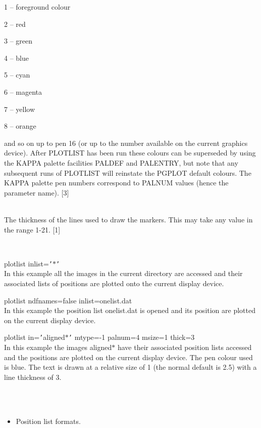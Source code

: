\documentclass[twoside,11pt]{article}
\newcommand{\xref}[3]{#1}
\renewcommand{\_}{\texttt{\symbol{95}}}
\newcommand{\qs}[1]{{\tt '}#1{\tt '}}
\newcommand{\routine}[1]{{\sc #1}}
\newcommand{\sstexamples}[1]{
   \item[Examples:] \mbox{} \\
   \vspace{-3.5ex}
   \begin{description}
      #1
   \end{description}
}
\newcommand{\sstsubsection}[1]{ \item[{#1}] \mbox{} \\}
\newcommand{\sstexamplesubsection}[2]{\sloppy \item{\ssttt #1} \mbox{} \\ #2 }
\newcommand{\sstnotes}[1]{\item[Notes:] \mbox{} \\[1.3ex] #1}
\newcommand{\sstitemlist}[1]{
  \mbox{} \\
  \vspace{-3.5ex}
  \begin{itemize}
     #1
  \end{itemize}
}
\newcommand{\sstitem}{\item}
\newcommand{\sstexamples}[1]{
      \item[Examples:] \\
      \begin{description}
         #1
      \end{description}
      \\
   }
\newcommand{\sstsubsection}[1]{\item[{#1}]}
\newcommand{\sstexamplesubsection}[2]{\item[{\ssttt #1}] #2}
\newcommand{\sstnotes}[1]{\item[Notes:] #1 }
\newcommand{\sstitemlist}[1]{
      \begin{itemize}
         #1
      \end{itemize}
      \\
   }
\newcommand{\sstitem}{\item}
\begin{document}
{{{{            \sstitem
               1 -- foreground colour

            \sstitem
               2 -- red

            \sstitem
               3 -- green

            \sstitem
               4 -- blue

            \sstitem
               5 -- cyan

            \sstitem
               6 -- magenta

            \sstitem
               7 -- yellow

            \sstitem
               8 -- orange

         }
         and so on up to pen 16 (or up to the number available on the
         current graphics device). After \routine{PLOTLIST} has been run these
         colours can be superseded by using the KAPPA palette
         facilities \xref{PALDEF}{sun95}{PALDEF} and
         \xref{PALENTRY}{sun95}{PALENTRY}, but note that any subsequent
         runs of \routine{PLOTLIST} will reinstate the \xref{PGPLOT}{sun15}{}
         default colours.
         The KAPPA palette pen numbers correspond to PALNUM values
         (hence the parameter name).
         [3]
      }
      \sstsubsection{
         THICK = \_INTEGER (Read)
      } {
         The thickness of the lines used to draw the markers. This may
         take any value in the range 1-21.
         [1]
      }
   }
   \sstexamples{
      \sstexamplesubsection{
         plotlist inlist=\qs{$*$}
      } {
         In this example all the images in the current directory are
         accessed and their associated lists of positions are plotted
         onto the current display device.
      }
      \sstexamplesubsection{
         plotlist ndfnames=false inlist=one\_list.dat
      } {
         In this example the position list one\_list.dat is opened and
         its position are plotted on the current display device.
      }
      \sstexamplesubsection{
         plotlist in=\qs{aligned\_$*$} mtype=-1 palnum=4 msize=1 thick=3
      } {
         In this example the images aligned\_$*$ have their associated
         position lists accessed and the positions are plotted on the
         current display device. The pen colour used is blue. The
         text is drawn at a relative size of 1 (the normal default  is
         2.5) with a line thickness of 3.
      }
   }
   \sstnotes{
      \sstitemlist{

         \sstitem
             Position list formats.

}}}
\end{document}
